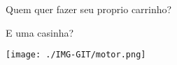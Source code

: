Quem quer fazer seu proprio carrinho?

E uma casinha?

\begin{center}
	\texttt{[image: ./IMG-GIT/motor.png]}
\end{center}

\vfill